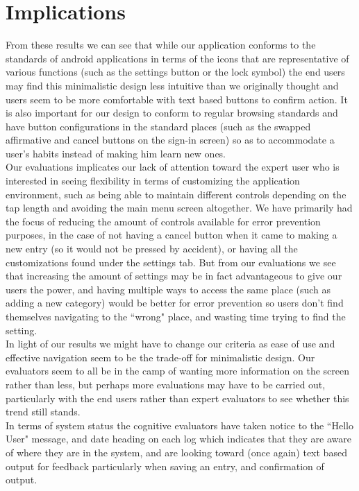 \documentclass[pdftex,12pt,a4paper]{report}
\begin{document}
\chapter{Implications}

From these results we can see that while our application conforms to the standards of android applications in terms of the icons that are representative of various functions (such as the settings button or the lock symbol) the end users may find this minimalistic design less intuitive than we originally thought and users seem to be more comfortable with text based buttons to confirm action. It is also important for our design to conform to regular browsing standards and have button configurations in the standard places (such as the swapped affirmative and cancel buttons on the sign-in screen) so as to accommodate a user's habits instead of making him learn new ones. \\

Our evaluations implicates our lack of attention toward the expert user who is interested in seeing flexibility in terms of customizing the application environment, such as being able to maintain different controls depending on the tap length and avoiding the main menu screen altogether. We have primarily had the focus of reducing the amount of controls available for error prevention purposes, in the case of not having a cancel button when it came to making a new entry (so it would not be pressed by accident), or having all the customizations found under the settings tab. But from our evaluations we see that increasing the amount of settings may be in fact advantageous to give our users the power, and having multiple ways to access the same place (such as adding a new category) would be better for error prevention so users don't find themselves navigating to the ``wrong" place, and wasting time trying to find the setting.\\

In light of our results we might have to change our criteria as ease of use and effective navigation seem to be the trade-off for minimalistic design. Our evaluators seem to all be in the camp of wanting more information on the screen rather than less, but perhaps more evaluations may have to be carried out, particularly with the end users rather than expert evaluators to see whether this trend still stands. \\

In terms of system status the cognitive evaluators have taken notice to the ``Hello User" message, and date heading on each log which indicates that they are aware of where they are in the system, and are looking toward (once again) text based output for feedback particularly when saving an entry, and confirmation of output.\\
\end{document}
